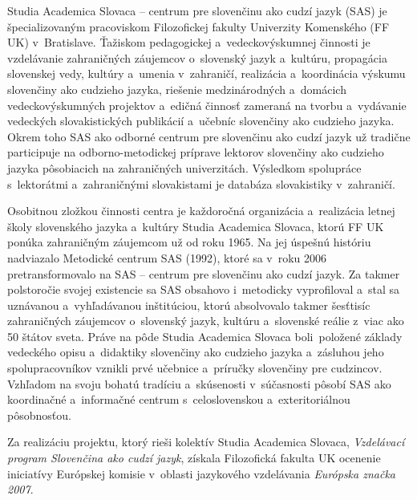 Studia Academica Slovaca – centrum pre slovenčinu ako cudzí jazyk (SAS) je špecializovaným pracoviskom Filozofickej fakulty Univerzity Komenského (FF UK) v~Bratislave. Ťažiskom pedagogickej a~vedeckovýskumnej činnosti je vzdelávanie zahraničných záujemcov o~slovenský jazyk a~kultúru, propagácia slovenskej vedy, kultúry a~umenia v~zahraničí, realizácia a~koordinácia výskumu slovenčiny ako cudzieho jazyka, riešenie medzinárodných a~domácich vedeckovýskumných projektov a~edičná činnosť zameraná na tvorbu a~vydávanie vedeckých slovakistických publikácií a~učebníc slovenčiny ako cudzieho jazyka. Okrem toho SAS ako odborné centrum pre slovenčinu ako cudzí jazyk už tradične participuje na odborno-metodickej príprave lektorov slovenčiny ako cudzieho jazyka pôsobiacich na zahraničných univerzitách. Výsledkom spolupráce s~lektorátmi a~zahraničnými slovakistami je databáza slovakistiky v~zahraničí.

Osobitnou zložkou činnosti centra je každoročná organizácia a~realizácia letnej školy slovenského jazyka a~kultúry Studia Academica Slovaca, ktorú FF UK ponúka zahraničným záujemcom už od roku 1965. Na jej úspešnú históriu nadviazalo Metodické centrum SAS (1992), ktoré sa v~roku 2006 pretransformovalo na SAS – centrum pre slovenčinu ako cudzí jazyk. Za takmer polstoročie svojej existencie sa SAS obsahovo i~metodicky vyprofiloval a~stal sa uznávanou a~vyhľadávanou inštitúciou, ktorú absolvovalo takmer šesťtisíc zahraničných záujemcov o~slovenský jazyk, kultúru a~slovenské reálie z~viac ako 50 štátov sveta. Práve na pôde Studia Academica Slovaca boli~položené základy vedeckého opisu a~didaktiky slovenčiny ako cudzieho jazyka a~zásluhou jeho spolupracovníkov vznikli prvé učebnice a~príručky slovenčiny pre cudzincov. Vzhľadom na svoju bohatú tradíciu a~skúsenosti v~súčasnosti pôsobí SAS ako koordinačné a~informačné centrum s~celoslovenskou a~exteritoriálnou pôsobnosťou.

Za realizáciu projektu, ktorý rieši kolektív Studia Academica Slovaca, \emph{Vzdelávací program Slovenčina ako cudzí jazyk}, získala Filozofická fakulta UK ocenenie iniciatívy Európskej komisie v~oblasti jazykového vzdelávania \emph{Európska značka 2007}.
